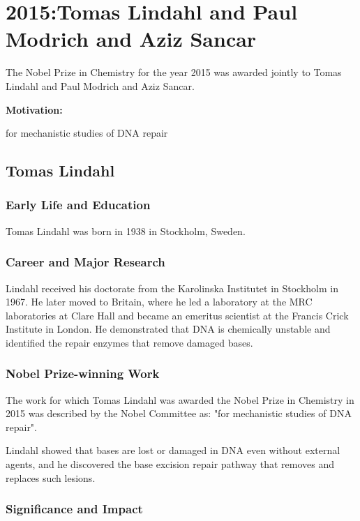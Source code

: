 \chapter{2015:Tomas Lindahl and Paul Modrich and Aziz Sancar}

\label{chap:chemistry2015}

The Nobel Prize in Chemistry for the year 2015 was awarded jointly to Tomas Lindahl and Paul Modrich and Aziz Sancar.

\textbf{Motivation:}

for mechanistic studies of DNA repair

\section{Tomas Lindahl}

\subsection*{Early Life and Education}

Tomas Lindahl was born in 1938 in Stockholm, Sweden.

\subsection*{Career and Major Research}

Lindahl received his doctorate from the Karolinska Institutet in Stockholm in 1967. He later moved to Britain, where he led a laboratory at the MRC laboratories at Clare Hall and became an emeritus scientist at the Francis Crick Institute in London. He demonstrated that DNA is chemically unstable and identified the repair enzymes that remove damaged bases.

\subsection*{Nobel Prize-winning Work}

The work for which Tomas Lindahl was awarded the Nobel Prize in Chemistry in 2015 was described by the Nobel Committee as: "for mechanistic studies of DNA repair".

Lindahl showed that bases are lost or damaged in DNA even without external agents, and he discovered the base excision repair pathway that removes and replaces such lesions.

\subsection*{Significance and Impact}

